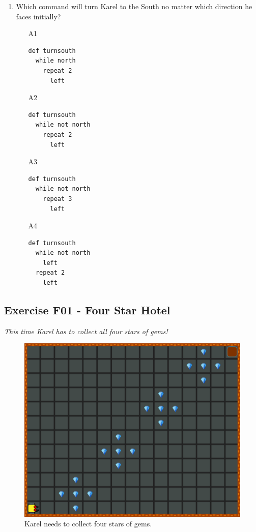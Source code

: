 \documentclass[article,A4,12pt]{llncs}
\begin{document}
{{{{\begin{enumerate}
\begin{enumerate}
\item[A3] 
\begin{verbatim}
def emptybag
  while empty
    put
\end{verbatim}
\item[A4] 
\begin{verbatim}
def emptybag
  while not empty
    put
\end{verbatim}
\end{enumerate}
\item Which command will turn Karel to the South no matter 
      which direction he faces initially?
\begin{enumerate}
\item[A1] 
\begin{verbatim}
def turnsouth
  while north
    repeat 2
      left
\end{verbatim}
\item[A2] 
\begin{verbatim}
def turnsouth
  while not north
    repeat 2
      left
\end{verbatim}
\item[A3] 
\begin{verbatim}
def turnsouth
  while not north
    repeat 3
      left
\end{verbatim}
\item[A4] 
\begin{verbatim}
def turnsouth
  while not north
    left
  repeat 2
    left
\end{verbatim}
\end{enumerate}
\end{enumerate}

\newpage
\subsection{Exercise F01 - Four Star Hotel}

{\em This time Karel has to collect all four stars of gems!}


\begin{figure}[!ht]
\begin{center}
\includegraphics[height=0.4\textwidth]{img/f01.png}
\end{center}
\vspace{-4mm}
\caption{Karel needs to collect four stars of gems.}
\label{fig:f01}
\vspace{-10mm}
\end{figure}
\noindent

}}}}
\end{document}

